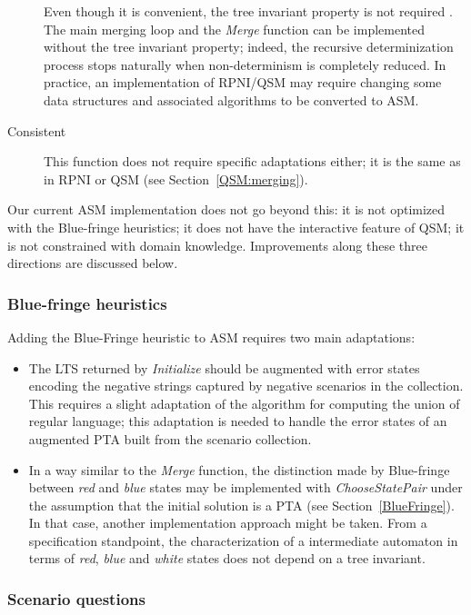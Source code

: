 \begin{description}
Even though it is convenient, the tree invariant property is not required \cite{Lambeau:2008}. The main merging loop and the \emph{Merge} function can be implemented without the tree invariant property; indeed, the recursive determinization process stops naturally when non-determinism is completely reduced. In practice, an implementation of RPNI/QSM may require changing some data structures and associated algorithms to be converted to ASM.

\item[Consistent] This function does not require specific adaptations either; it is the same as in RPNI or QSM (see Section~\ref{QSM:merging}).

\end{description}

Our current ASM implementation does not go beyond this: it is not optimized with the Blue-fringe heuristics; it does not have the interactive feature of QSM; it is not constrained with domain knowledge. Improvements along these three directions are discussed below.

\subsubsection*{Blue-fringe heuristics}

Adding the Blue-Fringe heuristic to ASM requires two main adaptations: 
\begin{itemize}
\item The LTS returned by \emph{Initialize} should be augmented with error states encoding the negative strings captured by negative scenarios in the collection. This requires a slight adaptation of the algorithm for computing the union of regular language; this adaptation is needed to handle the error states of an augmented PTA built from the scenario collection.
\item In a way similar to the \emph{Merge} function, the distinction made by Blue-fringe between \emph{red} and \emph{blue} states may be implemented with \emph{ChooseStatePair} under the assumption that the initial solution is a PTA (see Section~\ref{BlueFringe}). In that case, another implementation approach might be taken. From a specification standpoint, the characterization of a intermediate automaton in terms of \emph{red}, \emph{blue} and \emph{white} states does not depend on a tree invariant.
\end{itemize}

\subsubsection*{Scenario questions}

